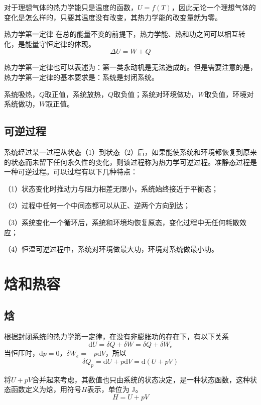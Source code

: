 \documentclass[lang=cn,newtx,11pt,scheme=chinese]{elegantbook}
\begin{document}
对于理想气体的热力学能只是温度的函数，$U=f(T)$，因此无论一个理想气体的变化是怎么样的，只要其温度没有改变，其热力学能的改变量就为零。

\begin{theorem}{热力学第一定律}
	在总的能量不变的前提下，热力学能、热和功之间可以相互转化，是能量守恒定律的体现。
	\begin{equation}
		\Delta U = W+Q
	\end{equation}

热力学第一定律也可以表述为：第一类永动机是无法造成的。但是需要注意的是，热力学第一定律的基本要求是：系统是封闭系统。
\end{theorem}

系统吸热，$Q$取正值，系统放热，$Q$取负值；系统对环境做功，$W$取负值，环境对系统做功，$W$取正值。

\subsection{可逆过程}
系统经过某一过程从状态（1）到状态（2）后，如果能使系统和环境都恢复到原来的状态而未留下任何永久性的变化，则该过程称为热力学可逆过程。准静态过程是一种可逆过程。可以过程有以下几种特点：

（1）状态变化时推动力与阻力相差无限小，系统始终接近于平衡态；

（2）过程中任何一个中间态都可以从正、逆两个方向到达；

（3）系统变化一个循环后，系统和环境均恢复原态，变化过程中无任何耗散效应；

（4）恒温可逆过程中，系统对环境做最大功，环境对系统做最小功。

\section{焓和热容}

\subsection{焓}
根据封闭系统的热力学第一定律，在没有非膨胀功的存在下，有以下关系
$$
\mathrm{d}U=\delta Q+ \delta W = \delta Q + \delta W_e
$$
当恒压时，$\mathrm{d}p=0$，$\delta W_e = -p\mathrm{d}V$，所以
$$
\delta Q_p = \mathrm{d}U + p\mathrm{d}V = \mathrm{d}(U+pV)
$$

将$U+pV$合并起来考虑，其数值也只由系统的状态决定，是一种状态函数，这种状态函数定义为焓，用符号$H$表示，单位为 J。
\begin{equation}
	H=U+pV
\end{equation}
\end{document}
